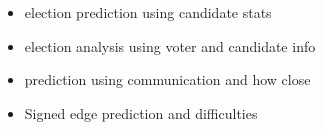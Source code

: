 \begin{itemize}
    \item election prediction using candidate stats
    \item election analysis using voter and candidate info
    \item prediction using communication and how close 
    \item Signed edge prediction and difficulties
\end{itemize}